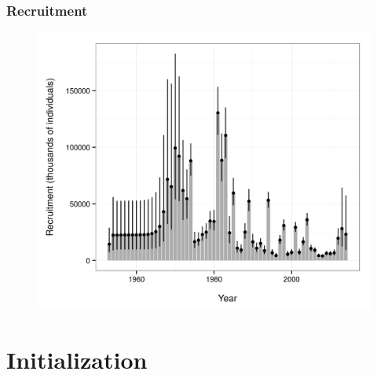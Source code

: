 \documentclass{beamer}
\begin{document}

\begin{frame}
\frametitle{Recruitment}
\begin{figure}[!htbp]
  \centering
  \includegraphics[width=0.75\linewidth]{../../examples/bbrkc/OneSex/figure/recruitment.png}
\end{figure}
\end{frame}


\section{Initialization}

\end{document}
